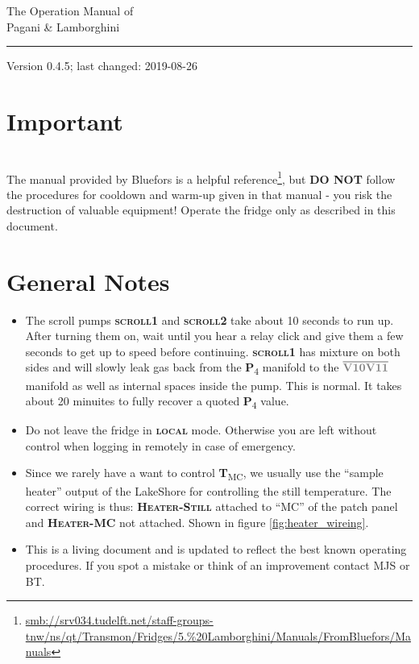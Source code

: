 \documentclass{article}[18pt,A4]
\newcommand{\thing}[1]{{\color{gray}\textsc{ \textbf{#1}}}}
\newcommand{\valve}[1]{{\color{gray}\textbf{V#1}}}
\newcommand{\pressure}[1]{{\color{pressurecolor}\textbf{P}\textsubscript{#1}}}
\newcommand{\temperature}[1]{{\color{temperaturecolor}\textbf{T}\textsubscript{#1}}}
\newcommand{\volume}[1]{\ensuremath{\overline{#1}}}
\begin{document}
{
\centering
{ \large \color{titlecolor} The Operation Manual of } \\
{ \Huge \color{titlecolor} Pagani \& Lamborghini } \\
{ \color{subsectioncolor}  \rule{\textwidth}{1px} }
}
{ \color{subsectioncolor} Version 0.4.5; last changed: 2019-08-26 } 



\section{Important}

\noindent{}
\\[1em]


The manual provided by Bluefors is a helpful reference\footnote{\url{smb://srv034.tudelft.net/staff-groups-tnw/ns/qt/Transmon/Fridges/5.\%20Lamborghini/Manuals/FromBluefors/Manuals}},
but \textbf{DO NOT} follow the procedures for cooldown and warm-up given in that manual 
 - you risk the destruction of valuable equipment!
 Operate the fridge only as described in this document.  
 

\tableofcontents

\newpage

\section{General Notes}
\begin{itemize}
\item The scroll pumps \thing{scroll1} and \thing{scroll2} take about 10 seconds to run up.
After turning them on, wait until you hear a relay click and give them a few seconds to get up to speed before continuing.
\thing{scroll1} has mixture on both sides and will slowly leak gas back from the \pressure{4}
manifold to the \volume{\valve{10} \valve{11}} manifold as well as internal spaces inside the pump.
This is normal. It takes about 20 minuites
to fully recover a quoted \pressure{4} value.
\item Do not leave the fridge in \thing{local} mode. Otherwise you are left without control when
logging in remotely in case of emergency.
\item Since we rarely have a want to control \temperature{MC},
we usually use the ``sample heater'' output of the LakeShore for controlling
the still temperature. The correct wiring is thus: \thing{Heater-Still} attached 
to ``MC'' of the patch panel and \thing{Heater-MC} not attached. Shown in figure \ref{fig:heater_wireing}.
\item This is a living document and is updated to reflect the best known operating procedures.
If you spot a mistake or think of an improvement contact MJS or BT. 
\end{itemize}
\end{document}
